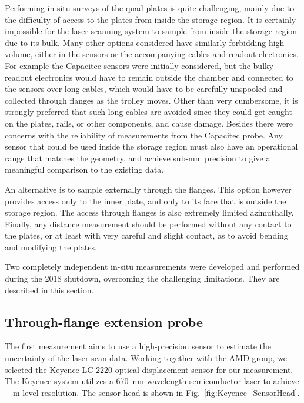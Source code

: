Performing in-situ surveys of the quad plates is quite challenging, mainly due to the difficulty of access to the plates from inside the storage region. 
It is certainly impossible for the laser scanning system to sample from inside the storage region due to its bulk. Many other options considered have similarly forbidding high volume, either in the sensors or the accompanying cables and readout electronics. 
For example the Capacitec sensors were initially considered, but the bulky readout electronics would have to remain outside the chamber and connected to the sensors over long cables, which would have to be carefully unspooled and collected through flanges as the trolley moves. 
Other than very cumbersome, it is strongly preferred that such long cables are avoided since they could get caught on the plates, rails, or other components, and cause damage. Besides there were concerns with the reliability of measurements from the Capacitec probe.
Any sensor that could be used inside the storage region must also have an operational range that matches the geometry, and achieve sub-mm precision to give a meaningful comparison to the existing data.


An alternative is to sample externally through the flanges. This option however provides access only to the inner plate, and only to its face that is outside the storage region. 
The access through flanges is also extremely limited azimuthally.
Finally, any distance measurement should be performed without any contact to the plates, or at least with very careful and slight contact, as to avoid bending and modifying the plates.

Two completely independent in-situ measurements were developed and performed during the 2018 shutdown, overcoming the challenging limitations. They are described in this section.




\subsection{\label{sec:ExtensionProbe} Through-flange extension probe}

The first measurement aims to use a high-precision sensor to estimate the uncertainty of the laser scan data. Working together with the AMD group, we selected the Keyence LC-2220 optical displacement sensor for our measurement.
The Keyence system utilizes a \SI{670}{nm} wavelength semiconductor laser to achieve \SI{}{{\micro}m}-level resolution. The sensor head is shown in Fig.~\ref{fig:Keyence_SensorHead}.

